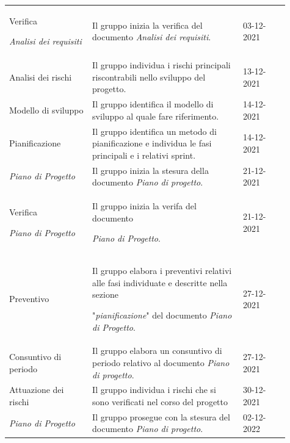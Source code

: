 {\begin{longtable}{p{0.27\linewidth}p{0.49\linewidth}p{0.15\linewidth}}
    \rowcolor[RGB]{216, 235, 171}
    Verifica \par \textit{Analisi dei requisiti} & Il gruppo inizia la verifica del documento \textit{Analisi dei requisiti}. & 03-12-2021\\

    \rowcolor[RGB]{233, 245, 206}
    Analisi dei rischi & Il gruppo individua i rischi principali riscontrabili nello sviluppo del progetto. & 13-12-2021\\

    \rowcolor[RGB]{216, 235, 171}
    Modello di sviluppo & Il gruppo identifica il modello di sviluppo al quale fare riferimento. & 14-12-2021\\

    \rowcolor[RGB]{233, 245, 206}
    Pianificazione & Il gruppo identifica un metodo di pianificazione e individua le fasi principali e i relativi sprint. & 14-12-2021\\

    \rowcolor[RGB]{216, 235, 171}
    \textit{Piano di Progetto} & Il gruppo inizia la stesura della documento \textit{Piano di progetto}. & 21-12-2021\\

    \rowcolor[RGB]{233, 245, 206}
    Verifica \par \textit{Piano di Progetto} & Il gruppo inizia la verifa del documento \par \textit{Piano di Progetto}. & 21-12-2021\\

    \rowcolor[RGB]{216, 235, 171}
    Preventivo & Il gruppo elabora i preventivi relativi alle fasi individuate e descritte nella sezione \par "\textit{pianificazione}" del documento \textit{Piano di Progetto}. & 27-12-2021\\

    \rowcolor[RGB]{233, 245, 206}
    Consuntivo di periodo & Il gruppo elabora un consuntivo di periodo relativo al documento \textit{Piano di progetto}. & 27-12-2021\\

    \rowcolor[RGB]{216, 235, 171}
    Attuazione dei rischi & Il gruppo individua i rischi che si sono verificati nel corso del progetto & 30-12-2021\\

    \rowcolor[RGB]{233, 245, 206}
    \textit{Piano di Progetto} & Il gruppo prosegue con la stesura del documento \textit{Piano di progetto}. & 02-12-2022\\
    

\end{longtable}}
